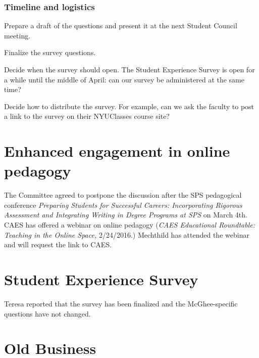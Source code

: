 \documentclass[10pt]{meetingmins}
\begin{document}
\subsubsection{Timeline and logistics}
\begin{subsubitems}
\item Prepare a draft of the questions and present it at the next Student Council meeting.
\item Finalize the survey questions.
\item Decide when the survey should open. The Student Experience Survey is open for a while until the middle of April: can our survey be administered at the same time?
\item Decide how to distribute the survey. For example, can we ask the faculty to post a link to the survey on their NYUClasses course site?
\end{subsubitems} 
\section{Enhanced engagement in online pedagogy}

The Committee agreed to postpone the discussion after the SPS pedagogical conference \emph{Preparing Students for Successful Careers: Incorporating Rigorous Assessment and Integrating Writing in Degree Programs at SPS} on March 4th. CAES has offered a webinar on online pedagogy (\emph{CAES Educational Roundtable: Teaching in the Online Space,} 2/24/2016.) Mechthild has attended the webinar and will request the link to CAES.

\section{Student Experience Survey}
Teresa reported that the survey has been finalized and the McGhee-specific questions have not changed.

\section{Old Business}
\priormins
\vspace{1em}
\end{document}
